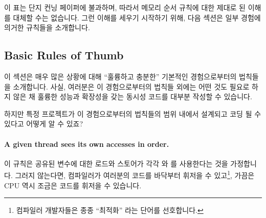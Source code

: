 이 표는 단지 컨닝 페이퍼에 불과하며, 따라서 메모리 순서 규칙에 대한 제대로 된
이해를 대체할 수는 없습니다.
그런 이해를 세우기 시작하기 위해, 다음 섹션은 일부 경험에 의거한 규칙들을
소개합니다.

\subsection{Basic Rules of Thumb}
\label{sec:memorder:Basic Rules of Thumb}

이 섹션은 매우 많은 상황에 대해 ``훌륭하고 충분한'' 기본적인 경험으로부터의
법칙들을 소개합니다.
사실, 여러분은 이 경험으로부터의 법칙들 외에는 어떤 것도 필요로 하지 않은 채
훌륭한 성능과 확장성을 갖는 동시성 코드를 대부분 작성할 수 있습니다.

\QuickQuiz{}
	하지만 특정 프로젝트가 이 경험으로부터의 법칙들의 범위 내에서 설계되고
	코딩 될 수 있다고 어떻게 알 수 있죠?

\QuickQuizAnswer{
	이 챕터의 나머지 부분들의 대부분의 목적이 정확히 이 질문에 답하는
	것입니다!

} \QuickQuizEnd

\paragraph{A given thread sees its own accesses in order.}
이 규칙은 공유된 변수에 대한 로드와 스토어가 각각  와
 를 사용한다는 것을 가정합니다.
그러지 않는다면, 컴파일러가 여러분의 코드를 바닥부터 휘저을 수 있고\footnote{
	컴파일러 개발자들은 종종 ``최적화'' 라는 단어를 선호합니다.}, 가끔은
CPU 역시 조금은 코드를 휘저을 수 있습니다.

